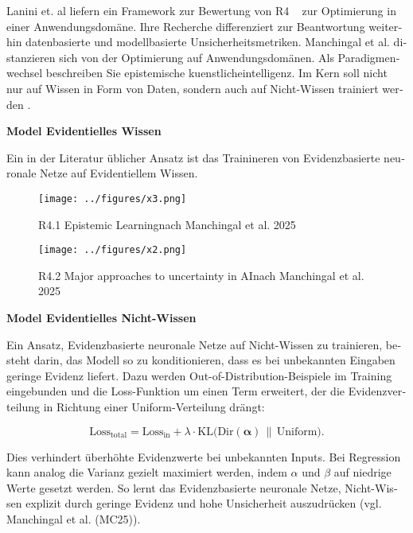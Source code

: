 \begin{otherlanguage}{ngerman}

Lanini et. al liefern ein Framework zur Bewertung von R4 ~\parencite{Lanini2024} zur Optimierung in einer Anwendungsdomäne. Ihre Recherche differenziert zur Beantwortung weiterhin datenbasierte und modellbasierte Unsicherheitsmetriken. 
\newline
Manchingal et al. distanzieren sich von der Optimierung auf Anwendungsdomänen. Als Paradigmenwechsel beschreiben Sie epistemische \gls{kuenstlicheintelligenz}. Im Kern soll nicht nur auf Wissen in Form von Daten, sondern auch auf Nicht-Wissen trainiert werden \parencite{manchingal2025}. 


\pagebreak


\textbf{Model Evidentielles Wissen}

Ein in der Literatur üblicher Ansatz ist das Trainineren von \gls{Evidenzbasierte neuronale Netze} auf Evidentiellem Wissen. 

\begin{figure}[!ht]
  \centering
  \texttt{[image: ../figures/x3.png]}
  \caption{R4.1 \glqq Epistemic Learning\grqq nach Manchingal et al. 2025}
\end{figure}

\begin{figure}[!ht]
  \centering
  \texttt{[image: ../figures/x2.png]}
  \caption{R4.2 \glqq Major approaches to uncertainty in AI\grqq nach Manchingal et al. 2025}
\end{figure}


\textbf{Model Evidentielles Nicht-Wissen}

Ein Ansatz, \gls{Evidenzbasierte neuronale Netze} auf Nicht-Wissen zu trainieren, besteht darin, das Modell so zu konditionieren, dass es bei unbekannten Eingaben geringe Evidenz liefert. Dazu werden \gls{Out-of-Distribution}-Beispiele im Training eingebunden und die Loss-Funktion um einen Term erweitert, der die Evidenzverteilung in Richtung einer Uniform-Verteilung drängt:

\begin{equation}
\text{Loss}_{\text{total}} 
= \text{Loss}_{\text{in}} 
+ \lambda \cdot \text{KL}\bigl(\text{Dir}(\boldsymbol{\alpha}) \,\|\, \text{Uniform}\bigr).
\end{equation}

Dies verhindert überhöhte Evidenzwerte bei unbekannten Inputs. Bei Regression kann analog die Varianz gezielt maximiert werden, indem $\alpha$ und $\beta$ auf niedrige Werte gesetzt werden. So lernt das \gls{Evidenzbasierte neuronale Netze}, Nicht-Wissen explizit durch geringe Evidenz und hohe Unsicherheit auszudrücken (vgl. Manchingal et al. (MC25)).



\end{otherlanguage}
